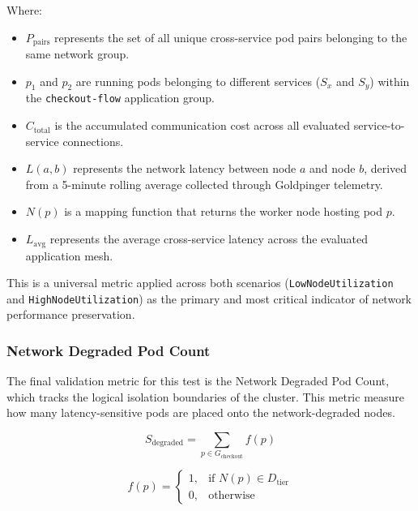 \noindent Where:
\begin{itemize}
    \item \(P_{\text{pairs}}\) represents the set of all unique cross-service pod pairs belonging to the same network group.

    \item \(p_1\) and \(p_2\) are running pods belonging to different services (\(S_x\) and \(S_y\)) within the \texttt{checkout-flow} application group.

    \item \(C_{\text{total}}\) is the accumulated communication cost across all evaluated service-to-service connections.

    \item \(L(a,b)\) represents the network latency between node \(a\) and node \(b\), derived from a 5-minute rolling average collected through Goldpinger telemetry.

    \item \(N(p)\) is a mapping function that returns the worker node hosting pod \(p\).

    \item \(L_{\text{avg}}\) represents the average cross-service latency across the evaluated application mesh.
\end{itemize}

This is a universal metric applied across both scenarios (\texttt{LowNodeUtilization} and \texttt{HighNodeUtilization}) as the primary and most critical indicator of network performance preservation.


\subsubsection{Network Degraded Pod Count}
\label{subsubsec:netaware4_evaluationmetrics4}

The final validation metric for this test is the Network Degraded Pod Count, which tracks the logical isolation boundaries of the cluster. This metric measure how many latency-sensitive pods are placed onto the network-degraded nodes.

\[
S_{\text{degraded}}
=
\sum_{p \in G_{\text{checkout}}} f(p)
\]

\[
f(p)
=
\begin{cases}
1, & \text{if } N(p) \in D_{\text{tier}} \\
0, & \text{otherwise}
\end{cases}
\]

